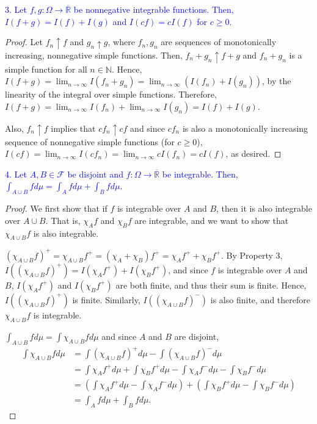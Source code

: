 \documentclass[12pt]{extarticle}
\newcommand{\F}{\mathscr{F}}
\newcommand{\R}{\overline{\mathbb{R}}}
\begin{document}
\textcolor{blue}{3. Let $f, g: \Omega \to \R$ be nonnegative integrable functions. Then, $I(f + g) = I(f) + I(g)$ and $I(cf) = cI(f)$ for $c \geq 0$.}

\begin{proof}    
    Let $f_n \uparrow f$ and $g_n \uparrow g$, where $f_n, g_n$ are sequences of monotonically increasing, nonnegative simple functions. Then, $f_n + g_n \uparrow f + g$ and $f_n + g_n$ is a simple function for all $n \in \mathbb{N}$. Hence, $I(f + g) = \lim_{n \to \infty} I(f_n + g_n) = \lim_{n \to \infty} (I(f_n) + I(g_n))$, by the linearity of the integral over simple functions. Therefore, $I(f + g) = \lim_{n \to \infty} I(f_n) + \lim_{n \to \infty}  I(g_n) = I(f) + I(g)$.
    
    Also, $f_n \uparrow f$ implies that $cf_n \uparrow cf$ and since $cf_n$ is also a monotonically increasing sequence of nonnegative simple functions (for $c \geq 0$), $I(cf) = \lim_{n \to \infty} I(cf_n) = \lim_{n \to \infty} cI(f_n) = cI(f)$, as desired. 
\end{proof}

\textcolor{blue}{4. Let $A, B \in \F$ be disjoint and $f: \Omega \to \R$ be integrable. Then, $\int_{A \cup B} f d\mu = \int_A f d\mu + \int_B f d\mu$.}

\begin{proof}
    We first show that if $f$ is integrable over $A$ and $B$, then it is also integrable over $A \cup B$. That is, $\chi_A f$ and $\chi_B f$ are integrable, and we want to show that $\chi_{A \cup B} f$ is also integrable.
    
    $(\chi_{A \cup B} f)^+ = \chi_{A \cup B} f^+ = (\chi_A + \chi_B)f^+ = \chi_Af^+ + \chi_B f^+$. By Property 3, $I((\chi_{A \cup B} f)^+) = I(\chi_Af^+) + I(\chi_Bf^+)$, and since $f$ is integrable over $A$ and $B$, $I(\chi_A f^+)$ and $I(\chi_B f^+)$ are both finite, and thus their sum is finite. Hence, $I((\chi_{A \cup B} f)^+)$ is finite. Similarly, $I((\chi_{A \cup B}f)^-)$ is also finite, and therefore $\chi_{A \cup B}f$ is integrable. 
    
    $\int_{A \cup B} f d\mu = \int \chi_{A \cup B} f d\mu$ and since $A$ and $B$ are disjoint, 
    \begin{align*}
        \int\chi_{A \cup B} f d\mu &= \int (\chi_{A \cup B} f)^+ d\mu - \int (\chi_{A \cup B} f)^-d\mu\\
        &= \int \chi_Af^+ d\mu + \int\chi_Bf^+ d\mu - \int \chi_A f^- d\mu - \int\chi_Bf^-d\mu \tag{by Property 3}\\
        &=  \left( \int\chi_Af^+ d\mu - \int\chi_Af^- d\mu \right) + \left( \int\chi_Bf^+ d\mu - \int\chi_Bf^- d\mu \right) \\
        &= \int_A f d\mu + \int_B fd\mu.
    \end{align*} 
\end{proof}
\end{document}
